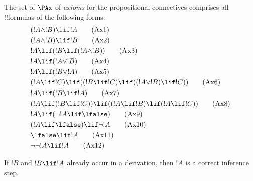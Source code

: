 \documentclass[../../../include/open-logic-section]{subfiles}
\begin{document}


\begin{defn}[Axioms]
The set of $\PAx$ of \emph{axioms} for the propositional connectives comprises
all !!{formula}s of the following forms:
\begin{align}
  & (!A \land !B) \lif !A \tag{Ax1}\\
  & (!A \land !B) \lif !B \tag{Ax2}\\
  & !A \lif (!B \lif (!A \land !B)) \tag{Ax3}\\
  & !A \lif (!A \lor !B) \tag{Ax4}\\
  & !A \lif (!B \lor !A) \tag{Ax5}\\
  & (!A \lif !C) \lif ((!B \lif !C) \lif ((!A \lor !B) \lif !C)) \tag{Ax6}\\
  & !A \lif (!B \lif !A) \tag{Ax7}\\
  & (!A \lif (!B \lif !C)) \lif
  ((!A \lif !B) \lif (!A \lif !C)) \tag{Ax8}\\
  & !A \lif (\lnot !A \lif \lfalse) \tag{Ax9}\\
  & (!A \lif \lfalse) \lif \lnot !A \tag{Ax10}\\
  & \lfalse \lif !A \tag{Ax11}\\
  & \lnot\lnot !A \lif !A \tag{Ax12}
\end{align}
\end{defn}

\begin{defn}
  If $!B$ and $!B \lif !A$ already occur in a derivation, then $!A$ is
  a correct inference step.
\end{defn}
\end{document}
